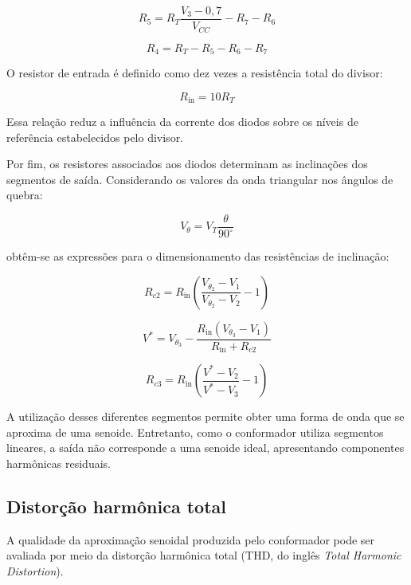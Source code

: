 \documentclass[11pt,a4paper]{article}
\begin{document}
\begin{equation}
R_5=R_T\frac{V_3-0,7}{V_{CC}}-R_7-R_6
\end{equation}

\begin{equation}
R_4=R_T-R_5-R_6-R_7
\label{eq:divisor}
\end{equation}

O resistor de entrada é definido como dez vezes a resistência total do divisor:

\begin{equation}
R_{\text{in}}=10R_T
\end{equation}

Essa relação reduz a influência da corrente dos diodos sobre os níveis de referência estabelecidos pelo divisor.

Por fim, os resistores associados aos diodos determinam as inclinações dos segmentos de saída. Considerando os valores da onda triangular nos ângulos de quebra:

\begin{equation}
V_{\theta}=V_T\frac{\theta}{90^\circ}
\end{equation}

obtêm-se as expressões para o dimensionamento das resistências de inclinação:

\begin{equation}
R_{c2}=R_{\text{in}}
\left(
\frac{V_{\theta_2}-V_1}
{V_{\theta_2}-V_2}-1
\right)
\end{equation}

\begin{equation}
V^*=V_{\theta_3}-
\frac{R_{\text{in}}(V_{\theta_3}-V_1)}
{R_{\text{in}}+R_{c2}}
\end{equation}

\begin{equation}
R_{c3}=R_{\text{in}}
\left(
\frac{V^*-V_2}{V^*-V_3}-1
\right)
\label{eq:inclinacao}
\end{equation}

A utilização desses diferentes segmentos permite obter uma forma de onda que se aproxima de uma senoide. Entretanto, como o conformador utiliza segmentos lineares, a saída não corresponde a uma senoide ideal, apresentando componentes harmônicas residuais.

\subsection{Distorção harmônica total}

A qualidade da aproximação senoidal produzida pelo conformador pode ser avaliada por meio da distorção harmônica total (THD, do inglês \textit{Total Harmonic Distortion}).
\end{document}
